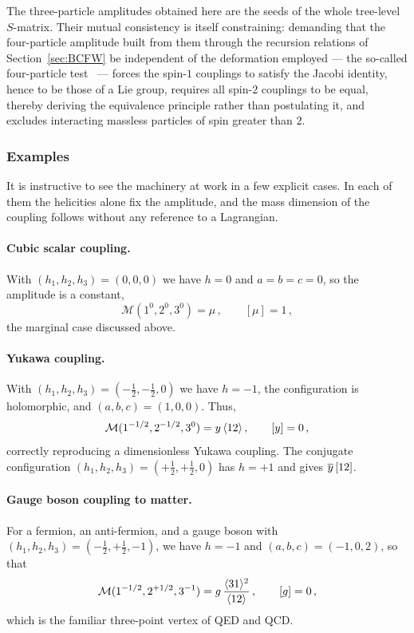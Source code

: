 The three-particle amplitudes obtained here are the seeds of the whole tree-level $S$-matrix. Their
mutual consistency is itself constraining: demanding that the four-particle amplitude built from
them through the recursion relations of Section~\ref{sec:BCFW} be independent of the deformation
employed --- the so-called four-particle test~\cite{Benincasa:2007xk} --- forces the spin-$1$
couplings to satisfy the Jacobi identity, hence to be those of a Lie group, requires all spin-$2$
couplings to be equal, thereby deriving the equivalence principle rather than postulating it, and
excludes interacting massless particles of spin greater than $2$.

\subsubsection{Examples}

It is instructive to see the machinery at work in a few explicit cases. In each of them the
helicities alone fix the amplitude, and the mass dimension of the coupling follows without any
reference to a Lagrangian.

\paragraph{Cubic scalar coupling.}
With $(h_1,h_2,h_3)=(0,0,0)$ we have $h=0$ and $a=b=c=0$, so the
    amplitude is a constant,
    \begin{equation}
        \mathcal M (1^{0},2^{0},3^{0}) = \mu\,,\qquad [\mu]=1\,,
    \end{equation}
    the marginal case discussed above.

\paragraph{Yukawa coupling.}
With $(h_1,h_2,h_3)=(-\tfrac12,-\tfrac12,0)$ we have $h=-1$, the
configuration is holomorphic, and $(a,b,c)=(1,0,0)$. Thus,
    \begin{equation}
        \mathcal M (1^{-1/2},2^{-1/2},3^{0}) = y\,\langle 1 2 \rangle\,,\qquad [y]=0\,,
    \end{equation}
correctly reproducing a dimensionless Yukawa coupling. The conjugate configuration
$(h_1,h_2,h_3)=(+\tfrac12,+\tfrac12,0)$ has $h=+1$ and gives $\overline y\,\lbrack 1 2 \rbrack$.

\paragraph{Gauge boson coupling to matter.}
For a fermion,
an anti-fermion, and a gauge boson with $(h_1,h_2,h_3)=(-\tfrac12,+\tfrac12,-1)$, we have $h=-1$ and $(a,b,c)=(-1,0,2)$, so that
    \begin{equation}
        \mathcal M (1^{-1/2},2^{+1/2},3^{-1}) = g\,\frac{\langle 3 1 \rangle^2}{\langle 1 2 \rangle}\,,\qquad [g]=0\,,
    \end{equation}
which is the familiar three-point vertex of QED and QCD.


